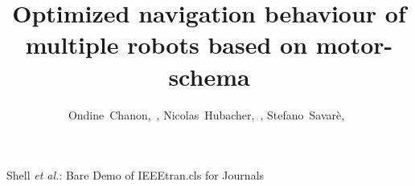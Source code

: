 \documentclass[journal]{IEEEtran}
\begin{document}
%
\title{Optimized navigation behaviour of multiple robots based on motor-schema}
%
%
%

\author{Ondine~Chanon,~,
        Nicolas~Hubacher,~,
        Stefano~Savar\`e,~}%

% 
%



%
{Shell \MakeLowercase{\textit{et al.}}: Bare Demo of IEEEtran.cls for Journals}
% 
\end{document}
